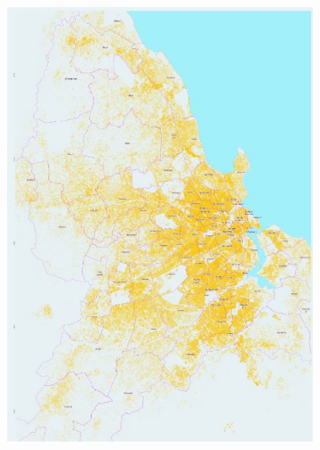 \documentclass[a4paper,12pt,twoside]{article}
\begin{document}
\begin{figure}[h]
\centering
  \begin{subfigure}[b]{0.27\textwidth}
    \includegraphics[width=\textwidth]{images/overview_buildings.JPG}
    \label{fig:1}
  \end{subfigure} \hspace{20mm} %
  \begin{subfigure}[b]{0.27\textwidth}

\end{subfigure}
\end{figure}
\end{document}

